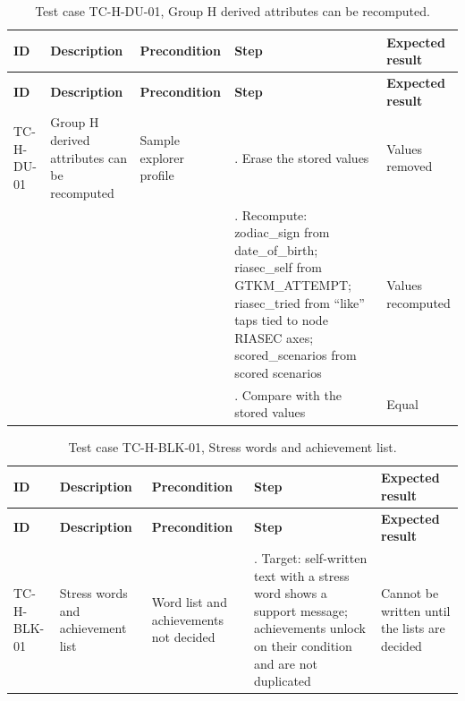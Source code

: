 {\small
\begin{longtable}{|>{\raggedright\arraybackslash}p{}|>{\raggedright\arraybackslash}p{}|>{\raggedright\arraybackslash}p{}|>{\raggedright\arraybackslash}p{}|>{\raggedright\arraybackslash}p{}|}
\caption{Test case TC-H-DU-01, Group H derived attributes can be recomputed.} \\
\hline
\textbf{ID} & \textbf{Description} & \textbf{Precondition} & \textbf{Step} & \textbf{Expected result} \\ \hline
\endfirsthead
\hline
\textbf{ID} & \textbf{Description} & \textbf{Precondition} & \textbf{Step} & \textbf{Expected result} \\ \hline
\endhead
TC-H-DU-01 & Group H derived attributes can be recomputed & Sample explorer profile & 1. Erase the stored values & Values removed \\ \hline
 &  &  & 2. Recompute: zodiac\_sign from date\_of\_birth; riasec\_self from GTKM\_ATTEMPT; riasec\_tried from ``like'' taps tied to node RIASEC axes; scored\_scenarios from scored scenarios & Values recomputed \\ \hline
 &  &  & 3. Compare with the stored values & Equal \\ \hline
\end{longtable}
}

{\small
\begin{longtable}{|>{\raggedright\arraybackslash}p{}|>{\raggedright\arraybackslash}p{}|>{\raggedright\arraybackslash}p{}|>{\raggedright\arraybackslash}p{}|>{\raggedright\arraybackslash}p{}|}
\caption{Test case TC-H-BLK-01, Stress words and achievement list.} \\
\hline
\textbf{ID} & \textbf{Description} & \textbf{Precondition} & \textbf{Step} & \textbf{Expected result} \\ \hline
\endfirsthead
\hline
\textbf{ID} & \textbf{Description} & \textbf{Precondition} & \textbf{Step} & \textbf{Expected result} \\ \hline
\endhead
TC-H-BLK-01 & Stress words and achievement list & Word list and achievements not decided & 1. Target: self-written text with a stress word shows a support message; achievements unlock on their condition and are not duplicated & Cannot be written until the lists are decided \\ \hline
\end{longtable}
}

